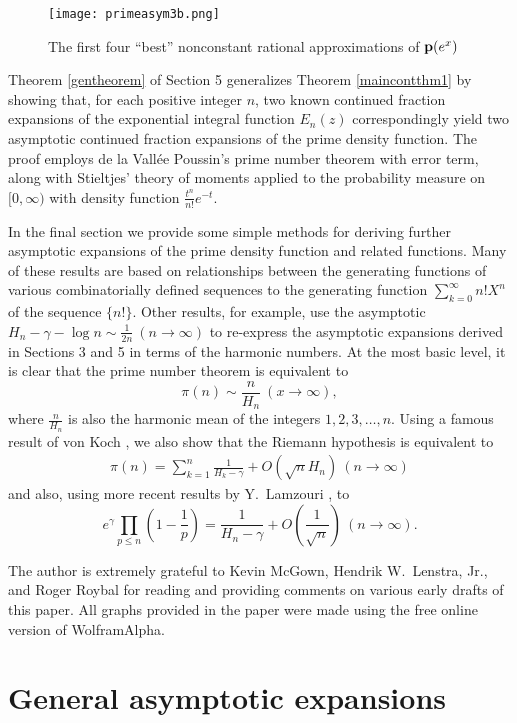 \documentclass[12pt]{article}
\begin{document}
\begin{figure}[ht!]
\centering
\texttt{[image: primeasym3b.png]}
\caption{The first four ``best'' nonconstant rational approximations of ${\mathbf p}(e^x)$}\label{primeasym3}
\end{figure}


Theorem \ref{gentheorem} of Section 5 generalizes Theorem \ref{maincontthm1} by showing that, for each positive integer $n$, two known continued fraction expansions of the exponential integral function $E_n(z)$ correspondingly yield two asymptotic continued fraction expansions of the prime density function.   The proof employs de la Vall\'ee Poussin's prime number theorem with error term, along with  Stieltjes' theory of moments applied to the probability measure on $[0,\infty)$ with density  function $\frac{t^n}{n!}e^{-t}$.


In the final section we provide some simple methods for deriving further asymptotic expansions of the prime density function and related functions.  Many of these results are based on relationships between the generating functions of various combinatorially defined sequences to the generating function $\sum_{k = 0}^\infty n! X^n$ of the sequence $\{n!\}$.  Other results, for example, use the asymptotic $H_n -\gamma - \log n \sim \frac{1}{2n} \ (n \to \infty)$ to re-express the asymptotic expansions derived in Sections 3 and 5 in terms of the harmonic numbers.   At the most basic level, it is clear that the prime number theorem is equivalent to $$\pi(n) \sim \frac{n}{H_n} \ (x \to \infty),$$ where $\frac{n}{H_n}$ is also the harmonic mean of the integers $1,2,3,\ldots,n$.   Using a famous result of von Koch \cite{koch}, we also show that the Riemann hypothesis is equivalent to
\begin{align*}
\pi(n) =  \sum_{k = 1}^{n} \frac{1}{H_k -\gamma}  + O(\sqrt{n} H_n) \ (n \to \infty)
\end{align*}
and also, using more recent results by Y.\ Lamzouri \cite{lam}, to
$$e^{\gamma} \prod_{p \leq n}\left(1-\frac{1}{p}\right) =  \frac{1}{H_n-\gamma} + O\left( \frac{1}{\sqrt{n}} \right) \ (n \to \infty).$$

The author is extremely grateful to Kevin McGown,  Hendrik W.\ Lenstra, Jr., and Roger Roybal for reading and providing comments on various early drafts of this paper.  All graphs provided in the paper were made using the free online version of WolframAlpha.


\section{General asymptotic expansions}
\end{document}
